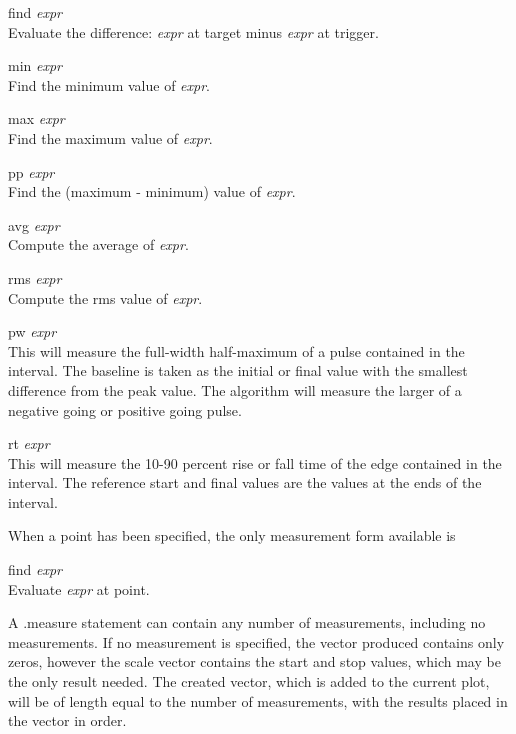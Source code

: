 \begin{description}
\item{{\vt find} {\it expr}}\\
Evaluate the difference:  {\it expr} at target minus {\it expr} at
trigger.
\item{{\vt min} {\it expr}}\\
Find the minimum value of {\it expr\/}.
\item{{\vt max} {\it expr}}\\
Find the maximum value of {\it expr\/}.
\item{{\vt pp} {\it expr}}\\
Find the (maximum - minimum) value of {\it expr\/}.
\item{{\vt avg} {\it expr}}\\
Compute the average of {\it expr\/}.
\item{{\vt rms} {\it expr}}\\
Compute the rms value of {\it expr\/}.
\item{{\vt pw} {\it expr}}\\
This will measure the full-width half-maximum of a pulse contained in
the interval.  The baseline is taken as the initial or final value
with the smallest difference from the peak value.  The algorithm will
measure the larger of a negative going or positive going pulse.
\item{{\vt rt} {\it expr}}\\
This will measure the 10-90 percent rise or fall time of the edge
contained in the interval.  The reference start and final values are
the values at the ends of the interval.
\end{description}

When a point has been specified, the only measurement form
available is

\begin{description}
\item{{\vt find} {\it expr}}\\
Evaluate {\it expr} at point.
\end{description}

A {\vt .measure} statement can contain any number of measurements,
including no measurements.  If no measurement is specified, the vector
produced contains only zeros, however the scale vector contains the
start and stop values, which may be the only result needed.  The
created vector, which is added to the current plot, will be of length
equal to the number of measurements, with the results placed in the
vector in order.

